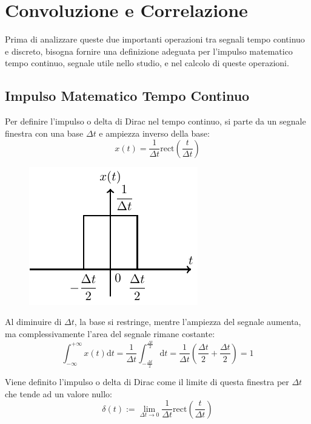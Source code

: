 \documentclass{article}
\newcommand{\rect}{\mathrm{rect}}
\newcommand{\df}{\mathrm{d}}
\numberwithin{equation}{subsection}
\begin{document}
\clearpage

\section{Convoluzione e Correlazione}

Prima di analizzare queste due importanti operazioni tra segnali tempo continuo e discreto, bisogna fornire una definizione adeguata per l'impulso matematico tempo 
continuo, segnale utile nello studio, e nel calcolo di queste operazioni.  

\subsection{Impulso Matematico Tempo Continuo}

Per definire l'impulso o delta di Dirac nel tempo continuo, si parte da un segnale finestra con una base $\Delta t$ e ampiezza inverso della base:
\begin{equation*}
    x(t)=\displaystyle\frac{1}{\Delta t}\rect\left(\frac{t}{\Delta t}\right)
\end{equation*}

\begin{figure}[H]%
    \centering
    \includegraphics{impulso-finestra.pdf}%
\end{figure}

Al diminuire di $\Delta t$, la base si restringe, mentre l'ampiezza del segnale aumenta, ma complessivamente l'area del segnale rimane costante:
\begin{equation*}
    \displaystyle\int_{-\infty}^{+\infty}x(t)\df t=\frac{1}{\Delta t}\int_{-\frac{\Delta t}{2}}^{\frac{\Delta t}{2}}\df t=\frac{1}{\Delta t}\left(\frac{\Delta t}{2}+\frac{\Delta t}{2}\right)=1
\end{equation*}

Viene definito l'impulso o delta di Dirac come il limite di questa finestra per $\Delta t$ che tende ad un valore nullo:
\begin{equation}
    \delta(t):=\lim_{\Delta t\to0}\displaystyle\frac{1}{\Delta t}\rect\left(\frac{t}{\Delta t}\right)
\end{equation}
\end{document}

